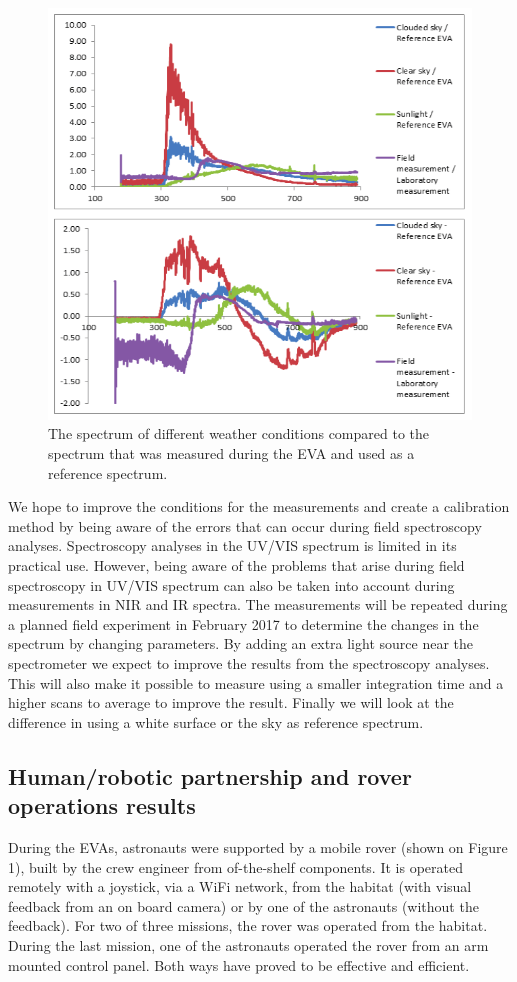 \documentclass[preprint]{elsarticle}
\begin{document}
\begin{figure}
\centering
\includegraphics{img/figure09.png}
\caption{The spectrum of different weather conditions compared to the spectrum that was measured during the EVA and used as a reference spectrum.}
\end{figure}

We hope to improve the conditions for the measurements and create a calibration method by being aware of the errors that can occur during field spectroscopy analyses. Spectroscopy analyses in the UV/VIS spectrum is limited in its practical use. However, being aware of the problems that arise during field spectroscopy in UV/VIS spectrum can also be taken into account during measurements in NIR and IR spectra. The measurements will be repeated during a planned field experiment in February 2017 to determine the changes in the spectrum by changing parameters. By adding an extra light source near the spectrometer we expect to improve the results from the spectroscopy analyses. This will also make it possible to measure using a smaller integration time and a higher scans to average to improve the result. Finally we will look at the difference in using a white surface or the sky as reference spectrum.

\subsection{Human/robotic partnership and rover operations results}
During the EVAs, astronauts were supported by a mobile rover (shown on Figure 1), built by the crew engineer from of-the-shelf components. It is operated remotely with a joystick, via a WiFi network, from the habitat (with visual feedback from an on board camera) or by one of the astronauts (without the feedback). For two of three missions, the rover was operated from the habitat. During the last mission, one of the astronauts operated the rover from an arm mounted control panel. Both ways have proved to be effective and efficient.
\end{document}
